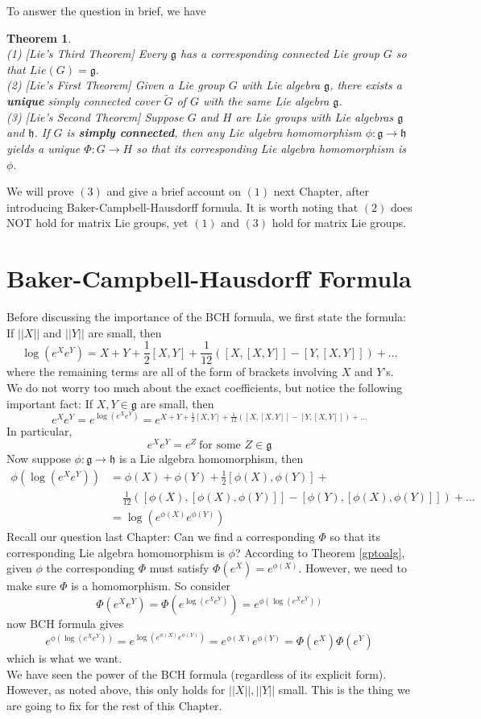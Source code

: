 \documentclass[11pt]{book}
\newtheorem{theorem}{Theorem}[section]
\newcommand{\mf}[1]{\mathfrak{#1}}
\begin{document}
\noindent To answer the question in brief, we have\\
\begin{theorem} \label{lietheorem} \mbox{}\\
(1) [Lie's Third Theorem] Every $\mf{g}$ has a corresponding connected Lie group $G$ so that $Lie(G) = \mf{g}$.\\
(2) [Lie's First Theorem] Given a Lie group $G$ with Lie algebra $\mf{g}$, there exists a \textbf{unique} simply connected cover $\tilde{G}$ of $G$ with the same Lie algebra $\mf{g}$.\\
(3) [Lie's Second Theorem] Suppose $G$ and $H$ are Lie groups with Lie algebras $\mf{g}$ and $\mf{h}$. If $G$ is \textbf{simply connected}, then any Lie algebra homomorphism $\phi: \mf{g} \to \mf{h}$ yields a unique $\Phi: G \to H$ so that its corresponding Lie algebra homomorphism is $\phi$.
\end{theorem}

We will prove $(3)$ and give a brief account on $(1)$ next Chapter, after introducing Baker-Campbell-Hausdorff formula. It is worth noting that $(2)$ does NOT hold for matrix Lie groups, yet $(1)$ and $(3)$ hold for matrix Lie groups.

\newpage
\chapter{Baker-Campbell-Hausdorff Formula}
Before discussing the importance of the BCH formula, we first state the formula: If $||X||$ and $||Y||$ are small, then
$$\log(e^Xe^Y) = X+Y + \frac{1}{2}[X,Y] + \frac{1}{12}([X,[X,Y]] - [Y,[X,Y]]) + \dots$$
where the remaining terms are all of the form of brackets involving $X$ and $Y$'s. We do not worry too much about the exact coefficients, but notice the following important fact: If $X, Y \in \mf{g}$ are small, then
$$e^Xe^Y = e^{\log(e^Xe^Y)} = e^{X+Y + \frac{1}{2}[X,Y] + \frac{1}{12}([X,[X,Y]] - [Y,[X,Y]]) + \dots}$$
In particular,
$$e^Xe^Y = e^Z\ \text{for some }Z \in \mf{g}$$
Now suppose $\phi: \mf{g} \to \mf{h}$ is a Lie algebra homomorphism, then
\begin{align*}
\phi(\log(e^Xe^Y)) &= \phi(X) + \phi(Y) + \frac{1}{2}[\phi(X),\phi(Y)] +\\
& \ \  \ \ \ \frac{1}{12}([\phi(X),[\phi(X),\phi(Y)]] - [\phi(Y),[\phi(X),\phi(Y)]]) + \dots \\
&= \log(e^{\phi(X)}e^{\phi(Y)})
\end{align*}
Recall our question last Chapter: Can we find a corresponding $\Phi$ so that its corresponding Lie algebra homomorphism is $\phi$? According to Theorem \ref{gptoalg}, given $\phi$ the corresponding $\Phi$ must satisfy $\Phi(e^X) = e^{\phi(X)}$. However, we need to make sure $\Phi$ is a homomorphism. So consider
$$\Phi(e^Xe^Y) = \Phi(e^{\log(e^Xe^Y)}) = e^{\phi(\log(e^{X}e^{Y}))}$$
now BCH formula gives
$$e^{\phi(\log(e^{X}e^{Y}))} = e^{\log(e^{\phi(X)}e^{\phi(Y)})} = e^{\phi(X)}e^{\phi(Y)} = \Phi(e^X)\Phi(e^Y)$$
which is what we want. \\
We have seen the power of the BCH formula (regardless of its explicit form). However, as noted above, this only holds for $||X||, ||Y||$ small. This is the thing we are going to fix for the rest of this Chapter.
\end{document}
